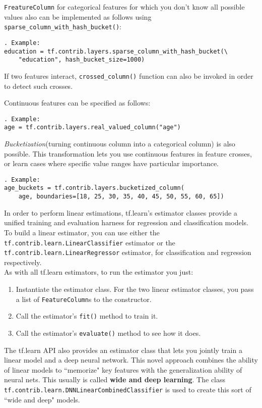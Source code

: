 \documentclass[11pt,a4paper]{article}
\begin{document}
\texttt{FreatureColumn} for categorical features for which you don't know all possible values also can be implemented as follows using \texttt{sparse\_column\_with\_hash\_bucket()}:
\begin{lstlisting}. Example: 
education = tf.contrib.layers.sparse_column_with_hash_bucket(\
    "education", hash_bucket_size=1000) 
\end{lstlisting}

If two features interact, \texttt{crossed\_column()} function can also be invoked in order to detect such crosses. 

Continuous features can be specified as follows: 
\begin{lstlisting}. Example: 
age = tf.contrib.layers.real_valued_column("age")
\end{lstlisting}
\textit{Bucketization}(turning continuous column into a categorical column) is also possible. This transformation lets you use continuous features in feature crosses, or learn cases where specific value ranges have particular importance. 
\begin{lstlisting}. Example: 
age_buckets = tf.contrib.layers.bucketized_column(
    age, boundaries=[18, 25, 30, 35, 40, 45, 50, 55, 60, 65])
\end{lstlisting}
In order to perform linear estimations, tf.learn's estimator classes provide a unified training and evaluation harness for regression and classification models. \\
To build a linear estimator, you can use either the \texttt{tf.contrib.learn.LinearClassifier} estimator or the \texttt{tf.contrib.learn.LinearRegressor} estimator, for classification and regression respectively. \\
As with all tf.learn estimators, to run the estimator you just: 
\begin{enumerate}
	\item Instantiate the estimator class. For the two linear estimator classes, you pass a list of \texttt{FeatureColumn}s to the constructor. 
	\item Call the estimator's \texttt{fit()} method to train it. 
	\item Call the estimator's \texttt{evaluate()} method to see how it does. 
\end{enumerate}

The tf.learn API also provides an estimator class that lets you jointly train a linear model and a deep neural network. This novel approach combines the ability of linear models to ``memorize" key features with the generalization ability of neural nets. This usually is called \textbf{wide and deep learning}. The class \texttt{tf.contrib.learn.DNNLinearCombinedClassifier} is used to create this sort of ``wide and deep" models. 
\end{document}
